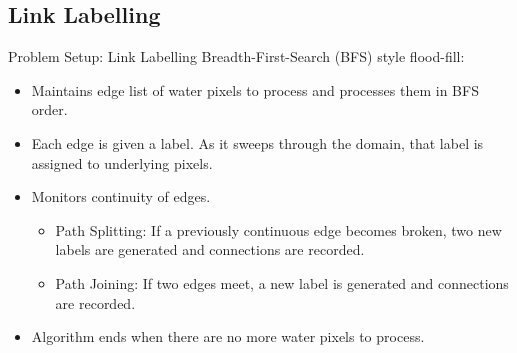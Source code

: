\documentclass[xcolor=pdflatex,dvipsnames,table]{beamer}
\begin{document}
\subsection{Link Labelling}
\begin{frame}{Problem Setup: Link Labelling}
Breadth-First-Search (BFS) style flood-fill:
\begin{itemize}
   \item Maintains edge list of water pixels to process and processes them in BFS order.
   \item Each edge is given a label. As it sweeps through the domain, that label is assigned to underlying pixels.
   \item Monitors continuity of edges.
\begin{itemize}
    \item Path Splitting: If a previously continuous edge becomes broken, two new labels are generated and connections are recorded. 
    \item Path Joining: If two edges meet, a new label is generated and connections are recorded.
\end{itemize}
   \item Algorithm ends when there are no more water pixels to process.
\end{itemize}
\end{frame}
\end{document}

